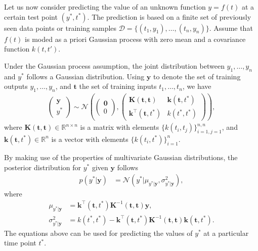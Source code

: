 \documentclass[journal]{IEEEtran}
\begin{document}
Let us now consider predicting the value of an unknown function $y = f(t)$ at a certain test point $(y^*, t^*)$. The prediction is based on a finite set of previously seen data points or training samples
$\mathcal{D}=\{(t_1, y_1), \ldots, (t_n, y_n)\}$. Assume that $f(t)$ is moded as a priori Gaussian process with zero mean and a covariance function $k(t,t')$.

Under the Gaussian process assumption, the joint distribution between $y_1, \ldots, y_n$ and $y^*$ follows a Gaussian distribution. Using $\mathbf{y}$ to denote the set of training outputs $y_1, \ldots, y_n$, and $\mathbf{t}$ the set of training inputs $t_1, \ldots, t_n$, we have
\begin{align*}
\begin{pmatrix}
\mathbf{y}\\
y^*
\end{pmatrix}\sim
\mathcal{N}
\left(
\begin{pmatrix}
\mathbf{0}\\
0
\end{pmatrix},
\begin{pmatrix}
\mathbf{K}(\mathbf{t}, \mathbf{t}) & \mathbf{k}(\mathbf{t}, t^*)\\
\mathbf{k}^{\top}(\mathbf{t}, t^*) & k(t^*, t^*)
\end{pmatrix}
\right),
\end{align*}
where $\mathbf{K}(\mathbf{t}, \mathbf{t})\in \mathbb{R}^{n\times n}$ is a matrix with elements
$\{k(t_i, t_j)\}_{i=1, j=1}^{n,n}$, and $\mathbf{k}(\mathbf{t}, t^*) \in \mathbb{R}^n$ is a vector with elements
$\{k(t_i, t^*)\}_{i=1}^n$.

By making use of the properties of multivariate Gaussian distributions, the posterior distribution for $y^*$ given
$\mathbf{y}$ follows
\begin{align*}
p(y^*|\mathbf{y}) & =\mathcal{N}(y^*|\mu_{y^*|\mathbf{y}}, \sigma^2_{y^*|\mathbf{y}}),
\end{align*}
where
\begin{align*}
\mu_{y^*|\mathbf{y}} & = \mathbf{k}^{\top}(\mathbf{t}, t^*)\mathbf{K}^{-1}(\mathbf{t}, \mathbf{t})\mathbf{y},\\
\sigma^2_{y^*|\mathbf{y}} & = k(t^*, t^*) - \mathbf{k}^{\top}(\mathbf{t}, t^*)\mathbf{K}^{-1}(\mathbf{t}, \mathbf{t})
\mathbf{k}(\mathbf{t}, t^*).
\end{align*}
The equations above can be used for predicting the values of $y^*$ at a particular time point $t^*$.
\end{document}

